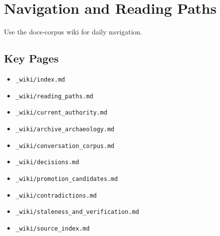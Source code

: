 \documentclass[10.5pt,a4paper]{book}
\begin{document}
\part{Navigation and Reading Paths}

Use the docs-\allowbreak{}corpus wiki for daily navigation.\allowbreak{}


\chapter{Key Pages}

\begin{itemize}
\item \texttt{\_\allowbreak{}wiki/\allowbreak{}index.\allowbreak{}md}
\item \texttt{\_\allowbreak{}wiki/\allowbreak{}reading\_\allowbreak{}paths.\allowbreak{}md}
\item \texttt{\_\allowbreak{}wiki/\allowbreak{}current\_\allowbreak{}authority.\allowbreak{}md}
\item \texttt{\_\allowbreak{}wiki/\allowbreak{}archive\_\allowbreak{}archaeology.\allowbreak{}md}
\item \texttt{\_\allowbreak{}wiki/\allowbreak{}conversation\_\allowbreak{}corpus.\allowbreak{}md}
\item \texttt{\_\allowbreak{}wiki/\allowbreak{}decisions.\allowbreak{}md}
\item \texttt{\_\allowbreak{}wiki/\allowbreak{}promotion\_\allowbreak{}candidates.\allowbreak{}md}
\item \texttt{\_\allowbreak{}wiki/\allowbreak{}contradictions.\allowbreak{}md}
\item \texttt{\_\allowbreak{}wiki/\allowbreak{}staleness\_\allowbreak{}and\_\allowbreak{}verification.\allowbreak{}md}
\item \texttt{\_\allowbreak{}wiki/\allowbreak{}source\_\allowbreak{}index.\allowbreak{}md}
\end{itemize}
\end{document}
